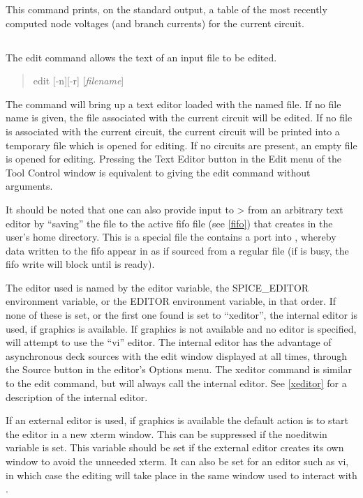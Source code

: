 This command prints, on the standard output, a table of the most
recently computed node voltages (and branch currents) for the current
circuit.

\subsection{}


The {\cb edit} command allows the text of an input file to be edited.
\begin{quote}\vt
edit [-n][-r] [{\it filename\/}]
\end{quote}
The command will bring up a text editor loaded with the named file. 
If no file name is given, the file associated with the current circuit
will be edited.  If no file is associated with the current circuit,
the current circuit will be printed into a temporary file which is
opened for editing.  If no circuits are present, an empty file is
opened for editing.  Pressing the {\cb Text Editor} button in the {\cb
Edit} menu of the {\cb Tool Control} window is equivalent to giving
the {\cb edit} command without arguments.

It should be noted that one can also provide input to {\WRspice}> from
an arbitrary text editor by ``saving'' the file to the active fifo
file (see \ref{fifo}) that {\WRspice} creates in the user's home
directory.  This is a special file the contains a port into
{\WRspice}, whereby data written to the fifo appear in {\WRspice} as
if sourced from a regular file (if {\WRspice} is busy, the fifo write
will block until {\WRspice} is ready).

The editor used is named by the {\et editor} variable, the {\et
SPICE\_EDITOR} environment variable, or the {\et EDITOR} environment
variable, in that order.  If none of these is set, or the first one
found is set to ``{\vt xeditor}'', the internal editor is used, if
graphics is available.  If graphics is not available and no editor is
specified, {\WRspice} will attempt to use the ``{\vt vi}'' editor. 
The internal editor has the advantage of asynchronous deck sources
with the edit window displayed at all times, through the {\cb Source}
button in the editor's {\cb Options} menu.  The {\cb xeditor} command
is similar to the {\cb edit} command, but will always call the
internal editor.  See \ref{xeditor} for a description of the internal
editor.

If an external editor is used, if graphics is available the default
action is to start the editor in a new {\vt xterm} window.  This can
be suppressed if the {\et noeditwin} variable is set.  This variable
should be set if the external editor creates its own window to avoid
the unneeded {\vt xterm}.  It can also be set for an editor such as
{\vt vi}, in which case the editing will take place in the same window
used to interact with {\WRspice}.

